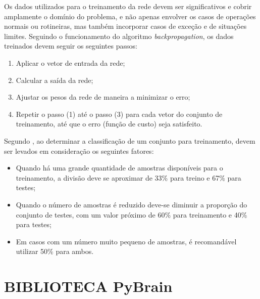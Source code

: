 Os dados utilizados para o treinamento da rede devem ser significativos e cobrir amplamente o domínio do problema, e não apenas envolver os casos de operações normais ou rotineiras, mas também incorporar casos de exceção e de situações limites. Seguindo o funcionamento do algoritmo \textit{backpropagation}, os dados treinados devem seguir os seguintes passos:

\begin{enumerate}
\item Aplicar o vetor de entrada da rede;
\item Calcular a saída da rede;
\item Ajustar os pesos da rede de maneira a minimizar o erro;
\item Repetir o passo (1) até o passo (3) para cada vetor do conjunto de treinamento, até que o erro (função de custo) seja satisfeito. 
\end{enumerate}

Segundo , ao determinar a classificação de um conjunto para treinamento, devem ser levados em consideração os seguintes fatores:

\begin{itemize}
\item Quando há uma grande quantidade de amostras disponíveis para o treinamento, a divisão deve se aproximar de 33\% para treino e 67\% para testes;
\item Quando o número de amostras é reduzido deve-se diminuir a proporção do conjunto de testes, com um valor próximo de 60\% para treinamento e 40\% para testes;
\item Em casos com um número muito pequeno de amostras, é recomandável utilizar 50\% para ambos.
\end{itemize}

\section{BIBLIOTECA PyBrain}








  